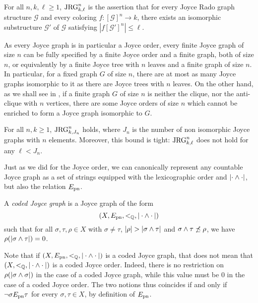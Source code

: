 \begin{statement}
	For all $n,k,\ell \geq 1$, $\mathrm{JRG}^n_{k,\ell}$ is the assertion that for every Joyce Rado graph structure $\mathcal{G}$ and every coloring $f:[\mathcal{G}]^n\to k$, there exists an isomorphic substructure $\mathcal{G}'$ of $\mathcal{G}$ satisfying $|f[\mathcal{G}']^n|\leq \ell$.
\end{statement}

As every Joyce graph is in particular a Joyce order, every finite Joyce graph of size $n$ can be fully specified by a finite Joyce order and a finite graph, both of size $n$, or equivalently by a finite Joyce tree with $n$ leaves and a finite graph of size $n$. In particular, for a fixed graph $G$ of size $n$, there are at most as many Joyce graphs isomorphic to it as there are Joyce trees with $n$ leaves. On the other hand, as we shall see in , if a finite graph $G$ of size $n$ is neither the clique, nor the anti-clique with $n$ vertices, there are some Joyce orders of size $n$ which cannot be enriched to form a Joyce graph isomorphic to $G$.

\begin{theorem}
	For all $n,k \geq 1$, $\mathrm{JRG}^n_{k,J_n}$ holds, where $J_n$ is the number of non isomorphic Joyce graphs with $n$ elements. Moreover, this bound is tight: $\mathrm{JRG}^n_{k,\ell}$ does not hold for any $\ell < J_n$.
\end{theorem}

Just as we did for the Joyce order, we can canonically represent any countable Joyce graph as a set of strings equipped with the lexicographic order and  $|{\cdot}\wedge{\cdot}|$, but also the relation $E_{\mathrm{pn}}$.

\begin{definition}
  A \emph{coded Joyce graph} is a Joyce graph of the form
  \[
  	(X,E_{\mathrm{pn}},<_{\mathbb{Q}},|\cdot\wedge\cdot|)
  \]
  such that for all $\sigma,\tau,\rho\in X$ with $\sigma\neq\tau$, $|\rho|>|\sigma\meet\tau|$ and $\sigma \wedge \tau \not \preceq \rho$, we have $\rho(|\sigma\wedge\tau|)=0$.
\end{definition}
Note that if $(X,E_{\mathrm{pn}},<_{\mathbb{Q}},|\cdot\wedge\cdot|)$ is a coded Joyce graph, that does not mean that $(X,<_{\mathbb{Q}},|\cdot\wedge\cdot|)$ is a coded Joyce order. Indeed, there is no restriction on $\rho(|\sigma\wedge\sigma|)$ in the case of a coded Joyce graph, while this value must be 0 in the case of a coded Joyce order. The two notions thus coincides  if and only if $\lnot \sigma E_{\mathrm{pn}}\tau$ for every $\sigma,\tau\in X$, by definition of $E_{\mathrm{pn}}$. %


